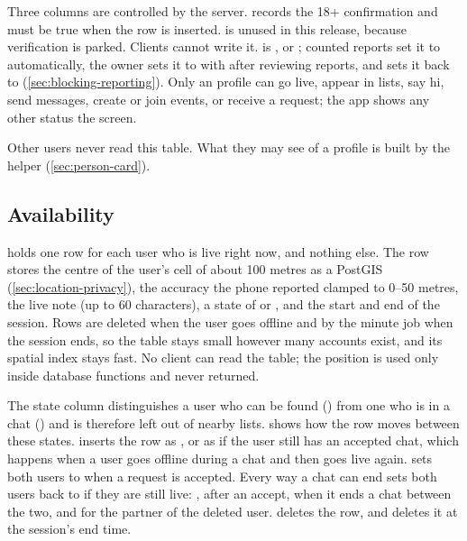 Three columns are controlled by the server.  records the 18+ confirmation and must be
true when the row is inserted.  is unused in this release, because verification is parked. Clients cannot write it.
 is ,  or ; counted reports set it to
 automatically, the owner sets it to  with  after
reviewing reports, and  sets it back to 
(\cref{sec:blocking-reporting}). Only an  profile can go live, appear in lists, say hi, send
messages, create or join events, or receive a request; the app shows any other status the
 screen.

Other users never read this table. What they may see of a profile is built by the helper
 (\cref{sec:person-card}).

\subsection{Availability}

 holds one row for each user who is live right now, and nothing else. The row stores
the centre of the user's cell of about 100 metres as a PostGIS 
(\cref{sec:location-privacy}), the accuracy the phone reported clamped to 0--50 metres, the live note
(up to 60 characters), a state of  or , and the start and end of the session.
Rows are deleted when the user goes offline and by the minute job when the session ends, so the table
stays small however many accounts exist, and its spatial index stays fast. No client can read the table;
the position is used only inside database functions and never returned.

The state column distinguishes a user who can be found () from one who is in a chat
() and is therefore left out of nearby lists.  shows how the row
moves between these states.  inserts the row as , or as  if the
user still has an accepted chat, which happens when a user goes offline during a chat and then goes live
again.  sets both users to  when a request is accepted. Every way a chat can
end sets both users back to  if they are still live: , 
after an accept,  when it ends a chat between the two, and  for the
partner of the deleted user.  deletes the row, and  deletes it at the
session's end time.

